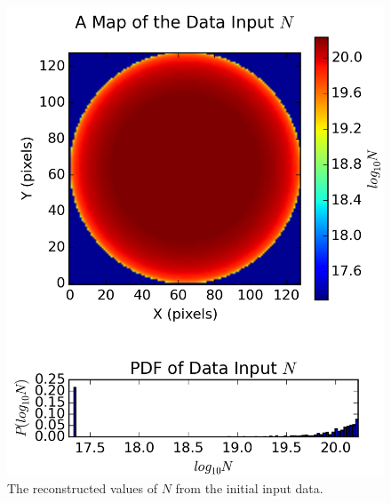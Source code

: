 \documentclass{report}
\begin{document}
\begin{figure}[H]
\begin{minipage}[b]{0.25\linewidth}
    \vspace{4ex}
  \end{minipage}%
  \begin{minipage}[b]{0.25\linewidth}
    \centering
    \includegraphics[width=\linewidth]{../img/sim/map_N_data.png}
    \caption{\protect The reconstructed values of $N$ from the initial input data.}\label{fig:map_N_data}
    \vspace{4ex}
  \end{minipage}
  \begin{minipage}[b]{0.25\linewidth}
    \centering

\end{minipage}
\end{figure}
\end{document}
